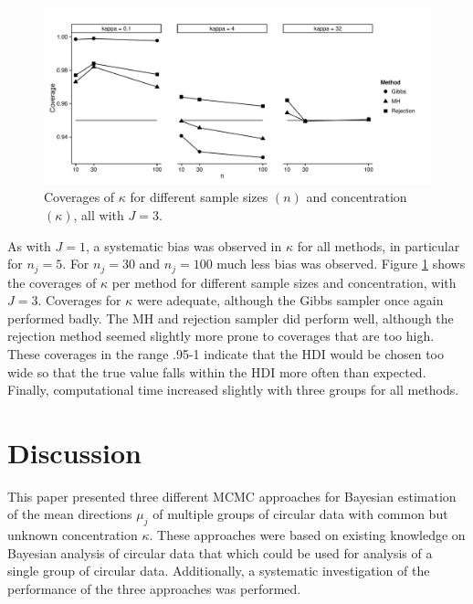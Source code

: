 \documentclass[bib]{ba/ba}
\begin{document}
\begin{figure}[bt]
\includegraphics[width=\textwidth]{Coverages.pdf}
\caption{Coverages of $\kappa$ for different sample sizes $(n)$ and concentration $(\kappa)$, all with $J=3$.}
\label{coverage}
\end{figure}



As with $J=1$, a systematic bias was observed in $\kappa$ for all methods, in particular for $n_j=5$. For $n_j=30$ and $n_j=100$ much less bias was observed. Figure \ref{coverage} shows the coverages of $\kappa$ per method for different sample sizes and concentration, with $J=3$. Coverages for $\kappa$ were adequate, although the Gibbs sampler once again performed badly.  The MH and rejection sampler did perform well, although the rejection method seemed slightly more prone to coverages that are too high. These coverages in the range .95-1 indicate that the HDI would be chosen too wide so that the true value falls within the HDI more often than expected. Finally, computational time increased slightly with three groups for all methods.



\section{Discussion \label{discussion}}

This paper presented three different MCMC approaches for Bayesian estimation of the mean directions $\mu_j$ of multiple groups of circular data with common but unknown concentration $\kappa$. These approaches were based on existing knowledge on Bayesian analysis of circular data that which could be used for analysis of a single group of circular data. Additionally, a systematic investigation of the performance of the three approaches was performed. 
\end{document}
